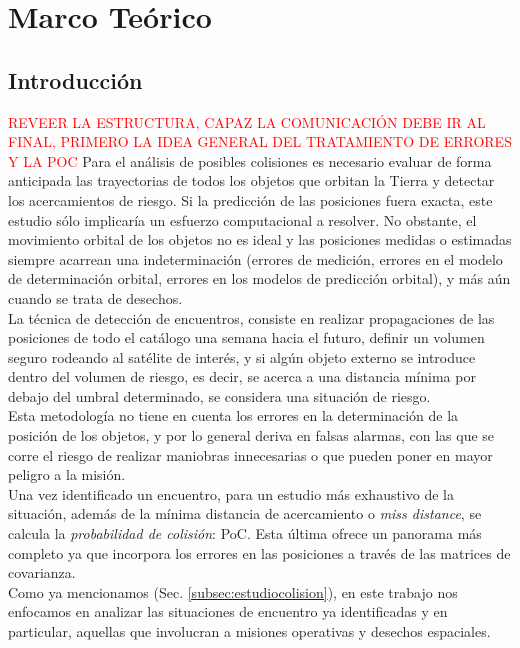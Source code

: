 \chapter{Marco Teórico}
\label{chap:marcoteorico}

\section{Introducci\'on}
\textcolor{red}{REVEER LA ESTRUCTURA, CAPAZ LA COMUNICACI\'ON DEBE IR AL FINAL, PRIMERO LA IDEA GENERAL DEL TRATAMIENTO DE ERRORES Y LA POC}
Para el an\'alisis de posibles colisiones es necesario evaluar de forma anticipada las trayectorias de todos los objetos que orbitan la Tierra y detectar los acercamientos de riesgo. Si la predicci\'on de las posiciones fuera exacta, este estudio s\'olo implicar\'ia un esfuerzo computacional a resolver. No obstante, el movimiento orbital de los objetos no es ideal y las posiciones medidas o estimadas siempre acarrean una indeterminaci\'on (errores de medici\'on, errores en el modelo de determinaci\'on orbital, errores en los modelos de predicci\'on orbital), y m\'as a\'un cuando se trata de desechos.\\

La t\'ecnica de detecci\'on de encuentros, consiste en realizar propagaciones de las posiciones de todo el cat\'alogo una semana hacia el futuro, definir un volumen seguro rodeando al sat\'elite de inter\'es, y si alg\'un objeto externo se introduce dentro del volumen de riesgo, es decir, se acerca a una distancia m\'inima por debajo del umbral determinado, se considera una situaci\'on de riesgo.\\ Esta metodolog\'ia no tiene en cuenta los errores en la determinaci\'on de la posici\'on de los objetos, y por lo general deriva en falsas alarmas, con las que se corre el riesgo de realizar maniobras innecesarias o que pueden poner en mayor peligro a la misi\'on.\\
Una vez identificado un encuentro, para un estudio m\'as exhaustivo de la situaci\'on, adem\'as de la m\'inima distancia de acercamiento o {\it{miss distance}}, se calcula la {\it{probabilidad de colisi\'on}}: PoC.  Esta \'ultima ofrece un panorama m\'as completo ya que incorpora los errores en las posiciones a trav\'es de las matrices de covarianza.\\

Como ya mencionamos (Sec. \ref{subsec:estudiocolision}), en este trabajo nos enfocamos en analizar las situaciones de encuentro ya identificadas y en particular, aquellas que involucran a misiones operativas y desechos espaciales.\\

